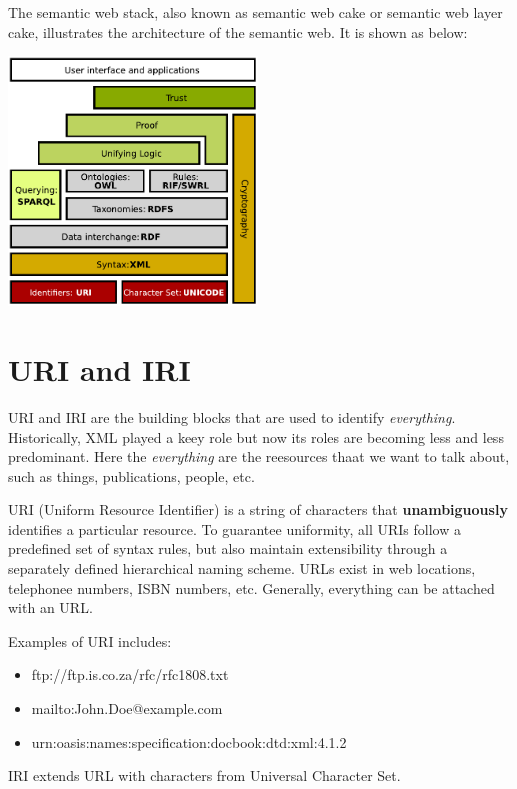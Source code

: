 \documentclass{article}
\theoremstyle{definition}
\begin{document}
The semantic web stack, also known as semantic web cake or semantic web layer cake, illustrates the architecture of the semantic web. It is shown as below:

\begin{center}
    \includegraphics[width=250px]{Semantic_Web/images/Semantic_web_stack.pdf}
\end{center}

\section{URI and IRI}

URI and IRI are the building blocks that are used to identify \textit{everything}. Historically, XML played a keey role but now its roles are becoming less and less predominant. Here the \textit{everything} are the reesources thaat we want to talk about, such as things, publications, people, etc.

URI (Uniform Resource Identifier) is a string of characters that \textbf{unambiguously} identifies a particular resource. To guarantee uniformity, all URIs follow a predefined set of syntax rules, but also maintain extensibility through a separately defined hierarchical naming scheme. URLs exist in web locations, telephonee numbers, ISBN numbers, etc. Generally, everything can be attached with an URL.

Examples of URI includes:

\begin{itemize}
    \item ftp://ftp.is.co.za/rfc/rfc1808.txt
    \item mailto:John.Doe@example.com
    \item urn:oasis:names:specification:docbook:dtd:xml:4.1.2 
\end{itemize}

IRI extends URL with characters from Universal Character Set.
\end{document}
